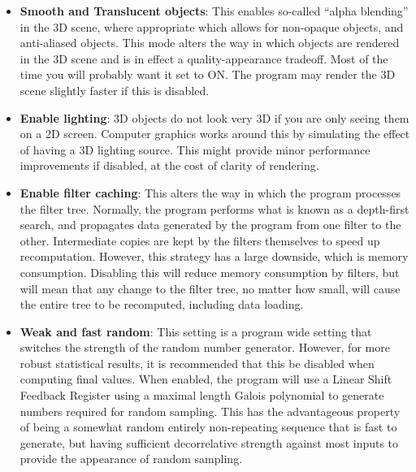 \documentclass[10pt]{article}
\begin{document}
\begin{itemize}
\item  \textbf{Smooth and Translucent objects}: This enables so-called ``alpha blending'' in the 3D scene, where appropriate which allows for non-opaque objects, and anti-aliased objects. This mode alters the way in which objects are rendered in the 3D scene and is in effect a quality-appearance tradeoff. Most of the time you will probably want it set to ON. The program may render the 3D scene slightly faster if this is disabled.
 
\item  \textbf{Enable lighting}: 3D objects do not look very 3D if you are only seeing them on a 2D screen. Computer graphics works around this by simulating the effect of having a 3D lighting source. This might provide minor performance improvements if disabled, at the cost of clarity of rendering.
 
\item \textbf{Enable filter caching}: This alters the way in which the program processes the filter tree. Normally, the program performs what is known as a depth-first search, and propagates data generated by the program from one filter to the other. Intermediate copies are kept by the filters themselves to speed up recomputation. However, this strategy has a large downside, which is memory consumption. Disabling this will reduce memory consumption by filters, but will mean that any change to the filter tree, no matter how small, will cause the entire tree to be recomputed, including data loading.

\item \textbf{Weak and fast random}: This setting is a program wide setting that switches the strength of the random number generator. However, for more robust statistical results, it is recommended that this be disabled when computing final values. When enabled, the program will use a Linear Shift Feedback Register using a maximal length Galois polynomial to generate numbers required for random sampling. This has the advantageous property of being a somewhat random entirely non-repeating sequence that is fast to generate, but having sufficient decorrelative strength against most inputs to provide the appearance of random sampling. 
\end{itemize}
\end{document}
